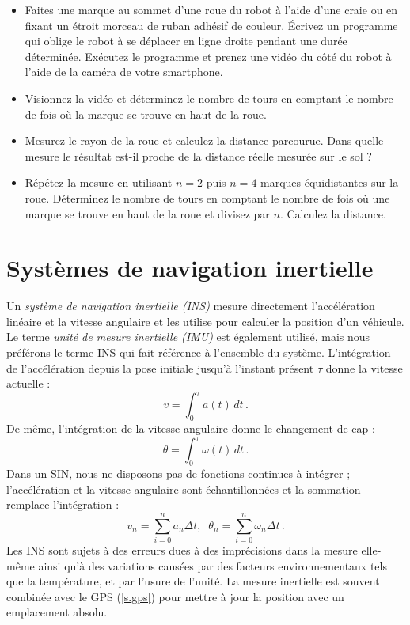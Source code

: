 {\begin{framed}
\begin{itemize}
\item Faites une marque au sommet d'une roue du robot à l'aide d'une craie ou en fixant un étroit morceau de ruban adhésif de couleur. Écrivez un programme qui oblige le robot à se déplacer en ligne droite pendant une durée déterminée. Exécutez le programme et prenez une vidéo du côté du robot à l'aide de la caméra de votre smartphone.
\item Visionnez la vidéo et déterminez le nombre de tours en comptant le nombre de fois où la marque se trouve en haut de la roue.
\item Mesurez le rayon de la roue et calculez la distance parcourue. Dans quelle mesure le résultat est-il proche de la distance réelle mesurée sur le sol ?
\item Répétez la mesure en utilisant $n=2$ puis $n=4$ marques équidistantes sur la roue. Déterminez le nombre de tours en comptant le nombre de fois où une marque se trouve en haut de la roue et divisez par $n$. Calculez la distance.
\end{itemize}
\end{framed}

\section{Systèmes de navigation inertielle}\label{s.imu}

Un \emph{système de navigation inertielle (INS)} mesure directement l'accélération linéaire et la vitesse angulaire et les utilise pour calculer la position d'un véhicule. Le terme \emph{unité de mesure inertielle (IMU)} est également utilisé, mais nous préférons le terme INS qui fait référence à l'ensemble du système. L'intégration de l'accélération depuis la pose initiale jusqu'à l'instant présent $\tau$ donne la vitesse actuelle :
\[
v=\int_0^\tau a(t) \,dt\,.
\]
De même, l'intégration de la vitesse angulaire donne le changement de cap :
\[
\theta = \int_0^\tau \omega(t) \, dt\,.
\]
Dans un SIN, nous ne disposons pas de fonctions continues à intégrer ; l'accélération et la vitesse angulaire sont échantillonnées et la sommation remplace l'intégration :
\[
v_n = \sum^{n}_{i=0} a_n \Delta t,\;\; \theta_n = \sum^{n}_{i=0} \omega_n \Delta t\,.
\]
Les INS sont sujets à des erreurs dues à des imprécisions dans la mesure elle-même ainsi qu'à des variations causées par des facteurs environnementaux tels que la température, et par l'usure de l'unité. La mesure inertielle est souvent combinée avec le GPS (\ref{s.gps}) pour mettre à jour la position avec un emplacement absolu.

}
